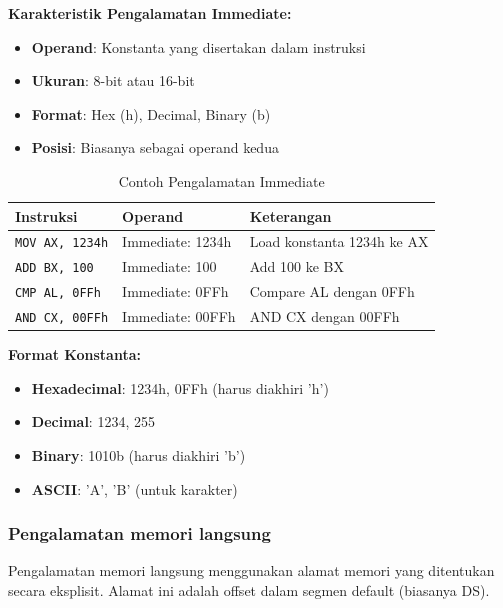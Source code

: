\documentclass[../main.tex]{subfiles}
\begin{document}
\textbf{Karakteristik Pengalamatan Immediate:}
\begin{itemize}
    \item \textbf{Operand}: Konstanta yang disertakan dalam instruksi
    \item \textbf{Ukuran}: 8-bit atau 16-bit
    \item \textbf{Format}: Hex (h), Decimal, Binary (b)
    \item \textbf{Posisi}: Biasanya sebagai operand kedua
\end{itemize}

\begin{table}[H]
    \centering
    \caption{Contoh Pengalamatan Immediate}
    \begin{tabular}{|p{3.5cm}|p{3.5cm}|p{6.5cm}|}
        \hline
        \textbf{Instruksi} & \textbf{Operand} & \textbf{Keterangan} \\
        \hline
        \texttt{MOV AX, 1234h} & Immediate: 1234h & Load konstanta 1234h ke AX \\
        \hline
        \texttt{ADD BX, 100} & Immediate: 100 & Add 100 ke BX \\
        \hline
        \texttt{CMP AL, 0FFh} & Immediate: 0FFh & Compare AL dengan 0FFh \\
        \hline
        \texttt{AND CX, 00FFh} & Immediate: 00FFh & AND CX dengan 00FFh \\
        \hline
    \end{tabular}
    \label{tab:immediate-addressing-examples}
\end{table}

\textbf{Format Konstanta:}
\begin{itemize}
    \item \textbf{Hexadecimal}: 1234h, 0FFh (harus diakhiri 'h')
    \item \textbf{Decimal}: 1234, 255
    \item \textbf{Binary}: 1010b (harus diakhiri 'b')
    \item \textbf{ASCII}: 'A', 'B' (untuk karakter)
\end{itemize}

            \subsubsection{Pengalamatan memori langsung}
Pengalamatan memori langsung menggunakan alamat memori yang ditentukan secara eksplisit. Alamat ini adalah offset dalam segmen default (biasanya DS).
\end{document}

